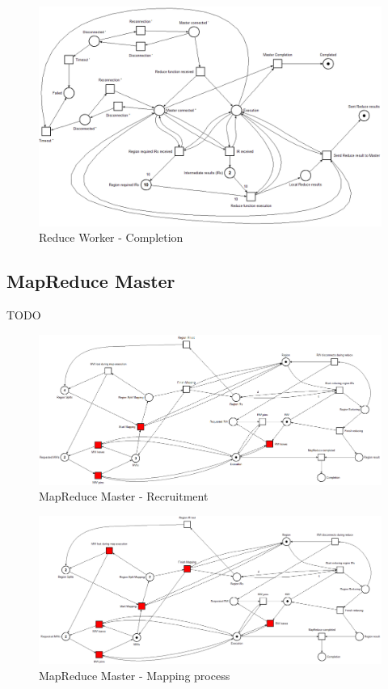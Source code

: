 \begin{figure}[!ht]
    \centering
    \includegraphics[width=\linewidth]{document/chapters/chapter_6/images/reduce_worker_petri_net_2.png}
    \caption{Reduce Worker - Completion}
    \label{fig:reduce_worker_petri_net_2}
\end{figure}

\subsection{MapReduce Master}
TODO

\begin{figure}[!ht]
    \centering
    \includegraphics[width=\linewidth]{document/chapters/chapter_6/images/master_petri_net_1.png}
    \caption{MapReduce Master - Recruitment}
    \label{fig:master_petri_net_1}
\end{figure}

\begin{figure}[!ht]
    \centering
    \includegraphics[width=\linewidth]{document/chapters/chapter_6/images/master_petri_net_2.png}
    \caption{MapReduce Master - Mapping process}
    \label{fig:master_petri_net_2}
\end{figure}

